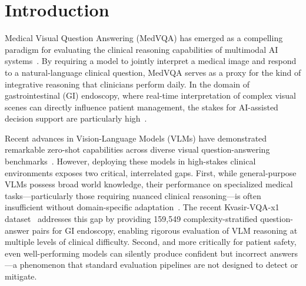 \documentclass[pdflatex,sn-mathphys-num]{sn-jnl}
\begin{document}

\maketitle

\section{Introduction}\label{sec:intro}

Medical Visual Question Answering (MedVQA) has emerged as a compelling paradigm for evaluating the clinical reasoning capabilities of multimodal AI systems~\cite{lin2023medvqa,hasan2018overview}. By requiring a model to jointly interpret a medical image and respond to a natural-language clinical question, MedVQA serves as a proxy for the kind of integrative reasoning that clinicians perform daily. In the domain of gastrointestinal (GI) endoscopy, where real-time interpretation of complex visual scenes can directly influence patient management, the stakes for AI-assisted decision support are particularly high~\cite{borgli2020hyperkvasir,ali2019deep}.

Recent advances in Vision-Language Models (VLMs) have demonstrated remarkable zero-shot capabilities across diverse visual question-answering benchmarks~\cite{dai2023instructblip,allal2025smolvlm}. However, deploying these models in high-stakes clinical environments exposes two critical, interrelated gaps. First, while general-purpose VLMs possess broad world knowledge, their performance on specialized medical tasks---particularly those requiring nuanced clinical reasoning---is often insufficient without domain-specific adaptation~\cite{li2023llava_med,gautam2025kvasirx1}. The recent Kvasir-VQA-x1 dataset~\cite{gautam2025kvasirx1} addresses this gap by providing 159,549 complexity-stratified question-answer pairs for GI endoscopy, enabling rigorous evaluation of VLM reasoning at multiple levels of clinical difficulty. Second, and more critically for patient safety, even well-performing models can silently produce confident but incorrect answers---a phenomenon that standard evaluation pipelines are not designed to detect or mitigate.
\end{document}
